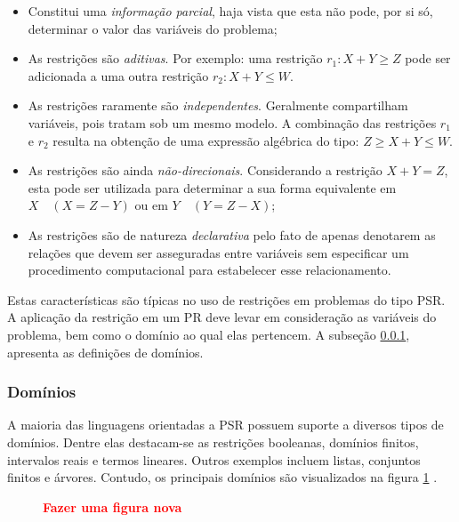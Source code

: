 \begin{itemize}
	\item Constitui uma \textit{informação parcial}, haja vista que esta não pode, por si só, determinar o valor das variáveis do problema;

	\item As restrições são \textit{aditivas}. Por exemplo: uma restrição $r_{1}: X + Y \geq Z $ pode ser adicionada a uma outra restrição $r_{2}: X + Y \leq W $.

	\item As restrições raramente são \textit{independentes}. Geralmente compartilham variáveis, pois tratam sob um mesmo modelo. A combinação das restrições $r_{1}$ e $r_{2}$ resulta na obtenção de uma expressão algébrica do tipo: $Z \geq X + Y \leq W$.

	\item As restrições são ainda \textit{não-direcionais}. Considerando a restrição $X + Y = Z$, esta pode ser utilizada para determinar a sua forma equivalente em $X \quad (X = Z - Y)$ ou em $Y \quad (Y = Z - X)$;

	\item As restrições são de natureza \textit{declarativa} pelo fato de apenas denotarem as relações que devem ser asseguradas entre variáveis sem especificar um procedimento computacional para  estabelecer esse relacionamento.
\end{itemize}

Estas  características são típicas no uso de restrições em problemas do tipo PSR. A aplicação da restrição em um PR deve levar em consideração as variáveis do problema, bem como o domínio ao qual elas pertencem. A subseção \ref{sec:dominios}, apresenta as definições de domínios.

\subsubsection{Domínios}
\label{sec:dominios}

A maioria das linguagens orientadas a PSR possuem suporte a diversos tipos de domínios. Dentre elas destacam-se as restrições booleanas, domínios finitos, intervalos reais e termos lineares. Outros  exemplos incluem listas, conjuntos finitos e árvores. Contudo, os principais domínios são visualizados na figura \ref{fig:dominios} \cite{sucupira_03}.

\begin{figure}[!ht]
\begin{center}
{\bf \textcolor{red}{Fazer uma figura nova}}

\label{fig:dominios}
\end{center}
\end{figure}




